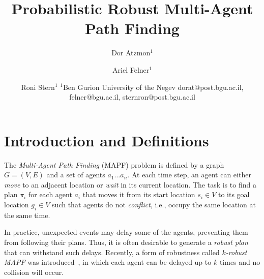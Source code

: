 \documentclass{article}
\title{Probabilistic Robust Multi-Agent Path Finding}
\author{
Dor Atzmon$^1$
\and
Ariel Felner$^1$\and
Roni Stern$^1$
\affiliations
$^1$Ben Gurion University of the Negev
\emails
dorat@post.bgu.ac.il,
felner@bgu.ac.il,
sternron@post.bgu.ac.il
}
\begin{document}
\maketitle

\section{Introduction and Definitions}
The {\em Multi-Agent Path Finding} (MAPF) problem is defined by a graph $G=(V,E)$ and a set of agents $a_1 \dots a_n$. At each time step, an agent can either {\em move} to an adjacent location or {\em wait} in its current location. The task is to find a plan $\pi_i$ for each agent $a_i$ that moves it from its start location $s_i \in V$ to its goal location $g_i \in V$ such that agents do not {\em conflict}, i.e., occupy the same location at the same time. 

In practice, unexpected events may delay some of the agents, preventing them from following their plans. Thus, it is often desirable to generate a {\em robust plan} that can withstand such delays. Recently, a form of robustness called \emph{$k$-robust MAPF} was introduced~\cite{DBLP:conf/socs/AtzmonSFWBZ18}, in which each agent can be delayed up to $k$ times and no collision will occur. 
\end{document}
